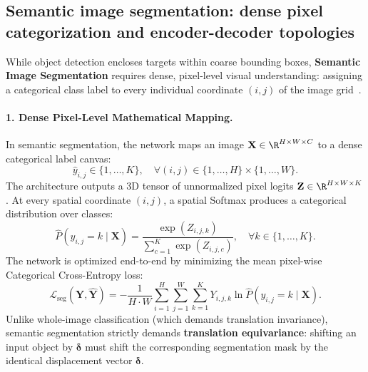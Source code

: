 \subsection{Semantic image segmentation: dense pixel categorization and encoder-decoder topologies}
\label{sec:semantic_segmentation_mechanics}

While object detection encloses targets within coarse bounding boxes, \textbf{Semantic Image Segmentation} requires dense, pixel-level visual understanding: assigning a categorical class label to every individual coordinate $(i, j)$ of the image grid~\cite{prince2023understanding,bishop2024deep}.

\paragraph{1. Dense Pixel-Level Mathematical Mapping.}
In semantic segmentation, the network maps an image $\mathbf{X} \in \R^{H \times W \times C}$ to a dense categorical label canvas:
\begin{equation}
\hat{y}_{i, j} \in \{1, \dots, K\}, \quad \forall (i, j) \in \{1, \dots, H\} \times \{1, \dots, W\}.
\label{eq:semantic_segmentation_mapping}
\end{equation}
The architecture outputs a 3D tensor of unnormalized pixel logits $\mathbf{Z} \in \R^{H \times W \times K}$. At every spatial coordinate $(i, j)$, a spatial Softmax produces a categorical distribution over classes:
\begin{equation}
\hat{P}(y_{i,j} = k \mid \mathbf{X}) = \frac{\exp(Z_{i, j, k})}{\sum_{c=1}^K \exp(Z_{i, j, c})}, \quad \forall k \in \{1, \dots, K\}.
\label{eq:pixelwise_softmax}
\end{equation}
The network is optimized end-to-end by minimizing the mean pixel-wise Categorical Cross-Entropy loss:
\begin{equation}
\mathcal{L}_{\text{seg}}(\mathbf{Y}, \hat{\mathbf{Y}}) = -\frac{1}{H \cdot W} \sum_{i=1}^H \sum_{j=1}^W \sum_{k=1}^K Y_{i, j, k} \ln \hat{P}(y_{i,j} = k \mid \mathbf{X}).
\label{eq:pixelwise_cross_entropy}
\end{equation}
Unlike whole-image classification (which demands translation invariance), semantic segmentation strictly demands \textbf{translation equivariance}: shifting an input object by $\boldsymbol{\delta}$ must shift the corresponding segmentation mask by the identical displacement vector $\boldsymbol{\delta}$.

